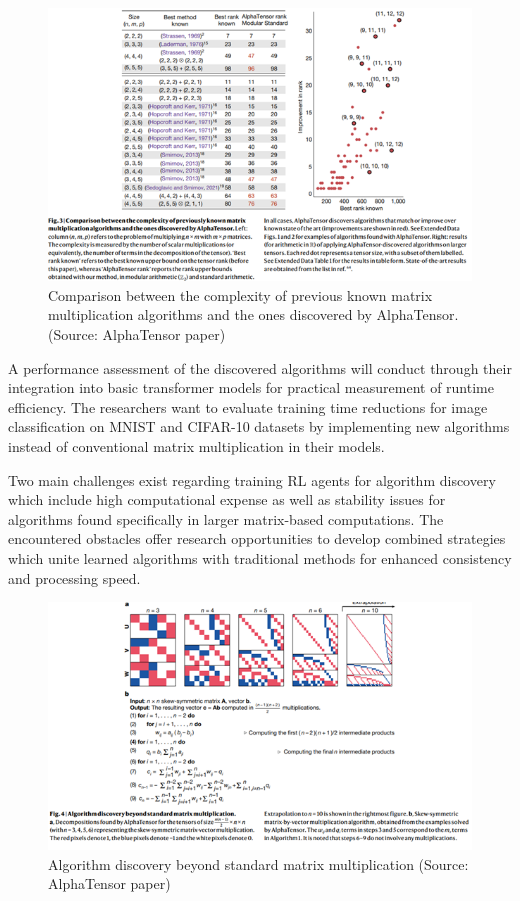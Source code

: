 \documentclass{article}
\begin{document}
\begin{figure}[H]
    \centering
    \includegraphics[width=0.6\linewidth]{Picture4.png}
    \caption{Comparison between the complexity of previous known matrix multiplication algorithms and the ones discovered by AlphaTensor. (Source: AlphaTensor paper)}
    \label{fig:comparison-alphatensor}
\end{figure}

A performance assessment of the discovered algorithms will conduct through their integration into basic transformer models for practical measurement of runtime efficiency. The researchers want to evaluate training time reductions for image classification on MNIST and CIFAR-10 datasets by implementing new algorithms instead of conventional matrix multiplication in their models.

Two main challenges exist regarding training RL agents for algorithm discovery which include high computational expense as well as stability issues for algorithms found specifically in larger matrix-based computations. The encountered obstacles offer research opportunities to develop combined strategies which unite learned algorithms with traditional methods for enhanced consistency and processing speed.

\begin{figure}[H]
    \centering
    \includegraphics[width=0.6\linewidth]{Picture5.png}
    \caption{Algorithm discovery beyond standard matrix multiplication (Source: AlphaTensor paper)}
    \label{fig:standard-matrix}
\end{figure}
\end{document}
